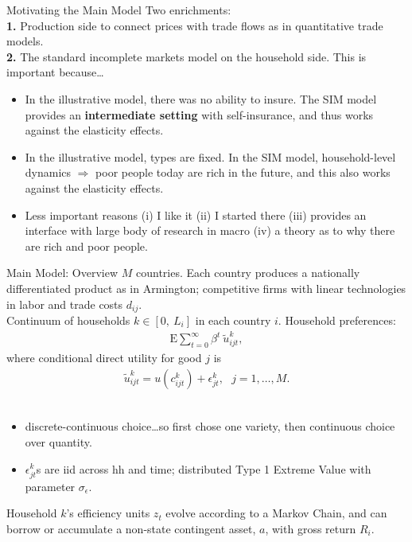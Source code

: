 \documentclass[9pt,pdftex,aspectratio=1610]{beamer}
\theoremstyle{definition}
\begin{document}
\begin{frame}[t]{Motivating the Main Model}
\smallskip
Two enrichments:\\
\medskip
\textbf{1.} Production side to connect prices with trade flows as in quantitative trade models.\\
\bigskip
\textbf{2.} The standard incomplete markets model on the household side. This is important because\ldots
\begin{itemize}
\smallskip
\item In the illustrative model, there was no ability to insure. The SIM model provides an \textbf{intermediate setting} with self-insurance, and thus works against the elasticity effects.
\smallskip
\item In the illustrative model, types are fixed. In the SIM model, household-level dynamics $\Rightarrow$ poor people today are rich in the future, and this also works against the elasticity effects.
\medskip
\item Less important reasons (i) I like it (ii) I started there (iii) provides an interface with large body of research in macro (iv) a theory as to why there are rich and poor people.
\end{itemize}
\end{frame}


\begin{frame}[t]{Main Model: Overview}
$M$ countries. Each country produces a nationally differentiated product as in Armington; competitive firms with linear technologies in labor and trade costs $d_{ij}$.\\
\bigskip
Continuum of households $k \in [0, \ L_i]$ in each country $i$. Household preferences:
\begin{align*}
\mathrm{E}\sum_{t = 0}^{\infty} \beta^{t} \ \tilde{u}^k_{ijt},
\end{align*}
where conditional direct utility for good $j$ is
\begin{align*}
\tilde{u}^k_{ijt} =  u(c^k_{ijt}) + \epsilon^k_{jt}, \ \ \ j = 1, \ldots, M.
\end{align*}\\
\begin{itemize}
\item  discrete-continuous choice\ldots so first chose one variety, then continuous choice over quantity.
\smallskip
\item $\epsilon^k_{jt}$s are iid across hh and time; distributed Type 1 Extreme Value with parameter $\sigma_{\epsilon}$.
\end{itemize}
\bigskip
Household $k$'s efficiency units $z_t$ evolve according to a Markov Chain, and can borrow or accumulate a non-state contingent asset, $a$, with gross return $R_{i}$.
\end{frame}
\end{document}
